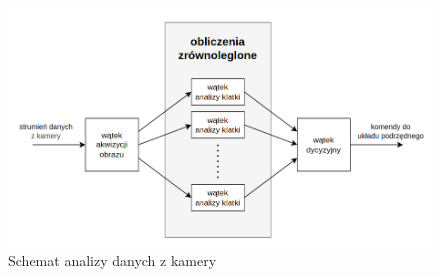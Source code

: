 \documentclass{article}
\begin{document}
        \begin{figure}[h]
            \centering
            \includegraphics[width=\textwidth]{figures/wysoki.png}
            \caption{Schemat analizy danych z kamery}
            \label{wysoki_poziom}
        \end{figure}
\end{document}

